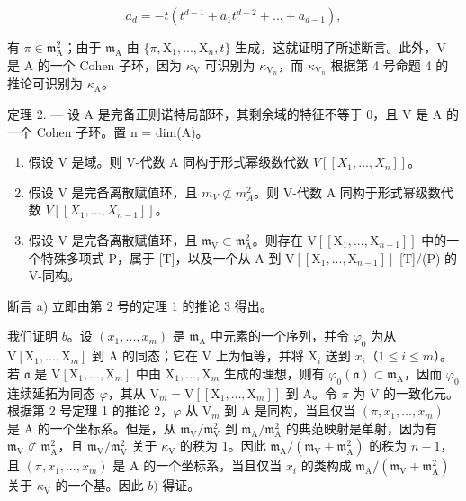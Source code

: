 \[
a _ {d} = - t \left(t ^ {d - 1} + a _ {1} t ^ {d - 2} + \dots + a _ {d - 1}\right),
\]

有 \(\pi\in\mathfrak{m}_{\mathrm{A}}^{2}\)；由于 \(\mathfrak{m}_{\mathrm{A}}\) 由 \(\{\pi,\mathrm{X}_{1},..., \mathrm{X}_{n},t\}\) 生成，这就证明了所述断言。此外，V 是 A 的一个 Cohen 子环，因为 \(\kappa_{\mathrm{V}}\) 可识别为 \(\kappa_{\mathrm{V}_{n}}\)，而 \(\kappa_{\mathrm{V}_{n}}\) 根据第 4 号命题 4 的推论可识别为 \(\kappa_{\mathrm{A}}\)。

定理 2. --- 设 A 是完备正则诺特局部环，其剩余域的特征不等于 0，且 V 是 A 的一个 Cohen 子环。置 n = dim(A)。

\begin{enumerate}
\def\labelenumi{\alph{enumi})}
\item
  假设 V 是域。则 V-代数 A 同构于形式幂级数代数 \(V[[X_{1}, ..., X_{n}]]\)。
\item
  假设 V 是完备离散赋值环，且 \(m_{V} \not\subset m_{A}^{2}\)。则 V-代数 A 同构于形式幂级数代数 \(V[[X_{1}, ..., X_{n-1}]]\)。
\item
  假设 V 是完备离散赋值环，且 \(\mathfrak{m}_{\mathrm{V}} \subset \mathfrak{m}_{\mathrm{A}}^{2}\)。则存在 \(\mathrm{V}[[\mathrm{X}_{1}, ..., \mathrm{X}_{n-1}]]\) 中的一个特殊多项式 P，属于 {[}T{]}，以及一个从 A 到 \(\mathrm{V}[[\mathrm{X}_{1}, ..., \mathrm{X}_{n-1}]]\) {[}T{]}/(P) 的 V-同构。
\end{enumerate}

断言 a) 立即由第 2 号的定理 1 的推论 3 得出。

我们证明 \(b\)。设 \((x_{1},\ldots,x_{m})\) 是 \(\mathfrak{m}_{\mathrm{A}}\) 中元素的一个序列，并令 \(\varphi_{0}\) 为从 \(\mathrm{V}[\mathrm{X}_{1},\ldots,\mathrm{X}_{m}]\) 到 A 的同态；它在 V 上为恒等，并将 \(\mathrm{X}_{i}\) 送到 \(x_{i}\)（\(1\leqslant i\leqslant m\)）。若 \(\mathfrak{a}\) 是 \(\mathrm{V}[\mathrm{X}_{1},\ldots,\mathrm{X}_{m}]\) 中由 \(\mathrm{X}_{1},\ldots,\mathrm{X}_{m}\) 生成的理想，则有 \(\varphi_{0}(\mathfrak{a})\subset\mathfrak{m}_{\mathrm{A}}\)，因而 \(\varphi_{0}\) 连续延拓为同态 \(\varphi\)，其从 \(\mathrm{V}_{m}=\mathrm{V}[[\mathrm{X}_{1},\ldots,\mathrm{X}_{m}]]\) 到 A。令 \(\pi\) 为 V 的一致化元。根据第 2 号定理 1 的推论 2，\(\varphi\) 从 \(\mathrm{V}_{m}\) 到 A 是同构，当且仅当 \((\pi,x_{1},\ldots,x_{m})\) 是 A 的一个坐标系。但是，从 \(\mathfrak{m}_{\mathrm{V}}/\mathfrak{m}_{\mathrm{V}}^{2}\) 到 \(\mathfrak{m}_{\mathrm{A}}/\mathfrak{m}_{\mathrm{A}}^{2}\) 的典范映射是单射，因为有 \(\mathfrak{m}_{\mathrm{V}}\not\subset\mathfrak{m}_{\mathrm{A}}^{2}\)，且 \(\mathfrak{m}_{\mathrm{V}}/\mathfrak{m}_{\mathrm{V}}^{2}\) 关于 \(\kappa_{\mathrm{V}}\) 的秩为 1。因此 \(\mathfrak{m}_{\mathrm{A}}/(\mathfrak{m}_{\mathrm{V}}+\mathfrak{m}_{\mathrm{A}}^{2})\) 的秩为 \(n-1\)，且 \((\pi,x_{1},\ldots,x_{m})\) 是 A 的一个坐标系，当且仅当 \(x_{i}\) 的类构成 \(\mathfrak{m}_{\mathrm{A}}/(\mathfrak{m}_{\mathrm{V}}+\mathfrak{m}_{\mathrm{A}}^{2})\) 关于 \(\kappa_{\mathrm{V}}\) 的一个基。因此 \(b)\) 得证。

